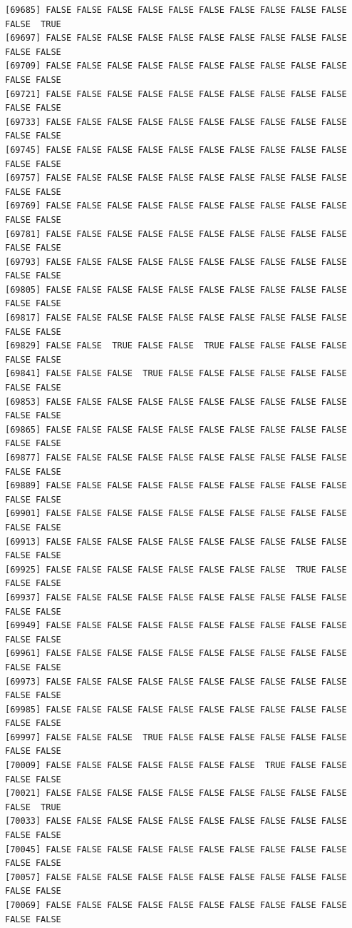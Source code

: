 \documentclass[
  a4paper,
  DIV=11,
  numbers=noendperiod]{scrartcl}
\begin{document}
\begin{verbatim}
[69685] FALSE FALSE FALSE FALSE FALSE FALSE FALSE FALSE FALSE FALSE FALSE  TRUE
[69697] FALSE FALSE FALSE FALSE FALSE FALSE FALSE FALSE FALSE FALSE FALSE FALSE
[69709] FALSE FALSE FALSE FALSE FALSE FALSE FALSE FALSE FALSE FALSE FALSE FALSE
[69721] FALSE FALSE FALSE FALSE FALSE FALSE FALSE FALSE FALSE FALSE FALSE FALSE
[69733] FALSE FALSE FALSE FALSE FALSE FALSE FALSE FALSE FALSE FALSE FALSE FALSE
[69745] FALSE FALSE FALSE FALSE FALSE FALSE FALSE FALSE FALSE FALSE FALSE FALSE
[69757] FALSE FALSE FALSE FALSE FALSE FALSE FALSE FALSE FALSE FALSE FALSE FALSE
[69769] FALSE FALSE FALSE FALSE FALSE FALSE FALSE FALSE FALSE FALSE FALSE FALSE
[69781] FALSE FALSE FALSE FALSE FALSE FALSE FALSE FALSE FALSE FALSE FALSE FALSE
[69793] FALSE FALSE FALSE FALSE FALSE FALSE FALSE FALSE FALSE FALSE FALSE FALSE
[69805] FALSE FALSE FALSE FALSE FALSE FALSE FALSE FALSE FALSE FALSE FALSE FALSE
[69817] FALSE FALSE FALSE FALSE FALSE FALSE FALSE FALSE FALSE FALSE FALSE FALSE
[69829] FALSE FALSE  TRUE FALSE FALSE  TRUE FALSE FALSE FALSE FALSE FALSE FALSE
[69841] FALSE FALSE FALSE  TRUE FALSE FALSE FALSE FALSE FALSE FALSE FALSE FALSE
[69853] FALSE FALSE FALSE FALSE FALSE FALSE FALSE FALSE FALSE FALSE FALSE FALSE
[69865] FALSE FALSE FALSE FALSE FALSE FALSE FALSE FALSE FALSE FALSE FALSE FALSE
[69877] FALSE FALSE FALSE FALSE FALSE FALSE FALSE FALSE FALSE FALSE FALSE FALSE
[69889] FALSE FALSE FALSE FALSE FALSE FALSE FALSE FALSE FALSE FALSE FALSE FALSE
[69901] FALSE FALSE FALSE FALSE FALSE FALSE FALSE FALSE FALSE FALSE FALSE FALSE
[69913] FALSE FALSE FALSE FALSE FALSE FALSE FALSE FALSE FALSE FALSE FALSE FALSE
[69925] FALSE FALSE FALSE FALSE FALSE FALSE FALSE FALSE  TRUE FALSE FALSE FALSE
[69937] FALSE FALSE FALSE FALSE FALSE FALSE FALSE FALSE FALSE FALSE FALSE FALSE
[69949] FALSE FALSE FALSE FALSE FALSE FALSE FALSE FALSE FALSE FALSE FALSE FALSE
[69961] FALSE FALSE FALSE FALSE FALSE FALSE FALSE FALSE FALSE FALSE FALSE FALSE
[69973] FALSE FALSE FALSE FALSE FALSE FALSE FALSE FALSE FALSE FALSE FALSE FALSE
[69985] FALSE FALSE FALSE FALSE FALSE FALSE FALSE FALSE FALSE FALSE FALSE FALSE
[69997] FALSE FALSE FALSE  TRUE FALSE FALSE FALSE FALSE FALSE FALSE FALSE FALSE
[70009] FALSE FALSE FALSE FALSE FALSE FALSE FALSE  TRUE FALSE FALSE FALSE FALSE
[70021] FALSE FALSE FALSE FALSE FALSE FALSE FALSE FALSE FALSE FALSE FALSE  TRUE
[70033] FALSE FALSE FALSE FALSE FALSE FALSE FALSE FALSE FALSE FALSE FALSE FALSE
[70045] FALSE FALSE FALSE FALSE FALSE FALSE FALSE FALSE FALSE FALSE FALSE FALSE
[70057] FALSE FALSE FALSE FALSE FALSE FALSE FALSE FALSE FALSE FALSE FALSE FALSE
[70069] FALSE FALSE FALSE FALSE FALSE FALSE FALSE FALSE FALSE FALSE FALSE FALSE

\end{verbatim}
\end{document}
